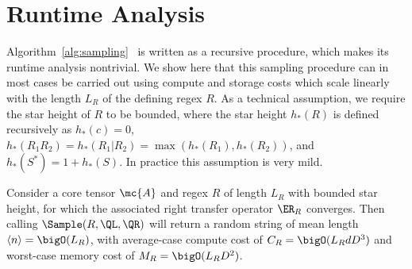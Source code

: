 \section{Runtime Analysis}
\label{sec:appendix_c}

Algorithm~\ref{alg:sampling} 
\ is written as a recursive procedure, which makes its runtime analysis nontrivial. We show here that this sampling procedure can in most cases be carried out using compute and storage costs which scale linearly with the length $L_R$ of the defining regex $R$. As a technical assumption, we require the star height of $R$ to be bounded, where the star height $h_*(R)$ is defined recursively as $h_*(c) = 0$, $h_*(R_1 R_2) = h_*(R_1 | R_2) = \max(h_*(R_1), h_*(R_2))$, and $h_*(S^*) = 1 + h_*(S)$. In practice this assumption is very mild.

\begin{theorem}
\label{thm:runtime}

Consider a core tensor $\mc{A}$ and regex $R$ of length $L_R$ with bounded star height, for which the associated right transfer operator $\ER_R$ converges. Then calling $\Sample(R, \QL, \QR)$ will return a random string of mean length $\langle n \rangle = \bigO(L_R)$, with average-case compute cost of $C_R = \bigO(L_R d D^3)$ and worst-case memory cost of $M_R = \bigO(L_R D^2)$.

\end{theorem}

